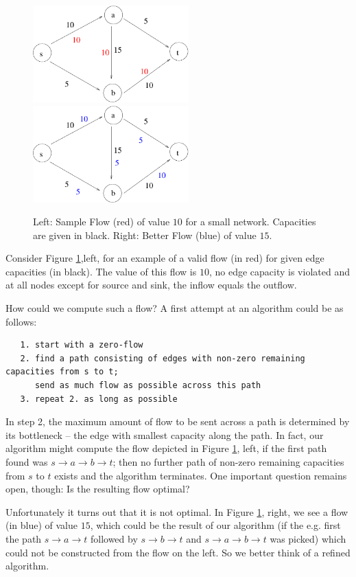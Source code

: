 \documentclass{article}
\begin{document}
\begin{figure}
\begin{center}
\includegraphics[width=6cm]{Figs/flow1.pdf} 
\hspace{1cm}
\includegraphics[width=6cm]{Figs/flow1b.pdf}
\end{center}
\caption{Left: Sample Flow (red) of value $10$ for a small network. Capacities are given in black. Right: Better Flow (blue) of value $15$.}\label{fig:flow1}
\end{figure}

Consider Figure \ref{fig:flow1},left, for an example of a valid flow (in red) for given edge capacities (in black). The value of this flow is $10$, no edge capacity is violated and at all nodes except for source and sink, the inflow equals the outflow.

How could we compute such a flow? A first attempt at an algorithm could be as follows:
\begin{verbatim}
   1. start with a zero-flow
   2. find a path consisting of edges with non-zero remaining capacities from s to t;
      send as much flow as possible across this path 
   3. repeat 2. as long as possible
\end{verbatim}
In step 2, the maximum amount of flow to be sent across a path is determined by its bottleneck -- the edge with smallest capacity along the path.
In fact, our algorithm might compute the flow depicted in Figure \ref{fig:flow1}, left, if the first path found was $s\rightarrow a\rightarrow b\rightarrow t$; then no further path of non-zero remaining capacities from $s$ to $t$ exists and the algorithm terminates. One important question remains open, though: Is the resulting flow optimal?

Unfortunately it turns out that it is not optimal. In Figure \ref{fig:flow1}, right, we see a flow (in blue) of value $15$, which could be the result of our algorithm (if the e.g. first the path $s\rightarrow a\rightarrow t$ followed by $s\rightarrow b \rightarrow t$ and $s\rightarrow a \rightarrow b \rightarrow t$ was picked) which could not be constructed from the flow on the left. So we better think of a refined algorithm.
\end{document}
